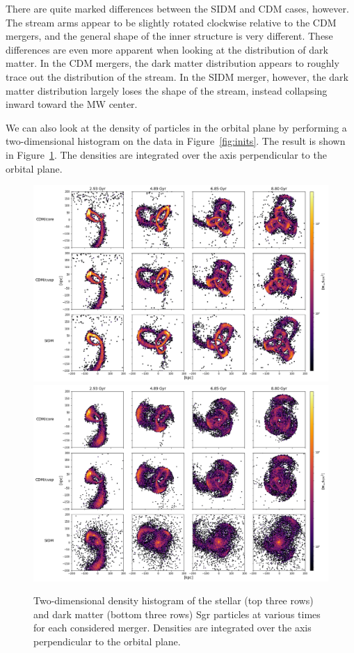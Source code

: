There are quite marked differences between the SIDM and CDM cases, however.
The stream arms appear to be slightly rotated clockwise relative to the CDM
mergers, and the general shape of the inner structure is very different. These
differences are even more apparent when looking at the distribution of dark
matter. In the CDM mergers, the dark matter distribution appears to roughly
trace out the distribution of the stream. In the SIDM merger, however, the dark
matter distribution largely loses the shape of the stream, instead collapsing
inward toward the MW center.

We can also look at the density of particles in the orbital plane by performing
a two-dimensional histogram on the data in Figure~\ref{fig:inits}.  The result
is shown in Figure~\ref{fig:densities}.  The densities are integrated over the
axis perpendicular to the orbital plane.

\begin{figure}
    \centering
    \includegraphics[width=0.9\linewidth]{figs/density_stars.png}
    \includegraphics[width=0.9\linewidth]{figs/density_darks.png}
    \caption{%
        Two-dimensional density histogram of the stellar (top three rows) and
        dark matter (bottom three rows) Sgr particles at various times for
        each considered merger.  Densities are integrated over the axis
        perpendicular to the orbital plane.
    }
    \label{fig:densities}
\end{figure}

